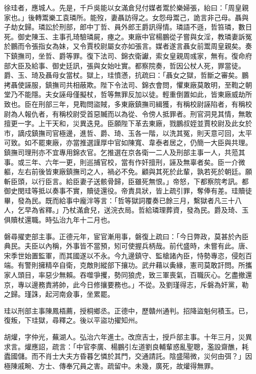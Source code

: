 \begin{pinyinscope}
徐珪者，應城人。先是，千戶吳能以女滿倉兒付媒者鬻於樂婦張，紿曰：「周皇親家也。」後轉鬻樂工袁璘所。能歿，妻聶訪得之。女怨母鬻己，詭言非己母。聶與子劫女歸。璘訟於刑部，郎中丁哲、員外郎王爵訊得情。璘語不遜，哲笞璘，數日死。御史陳玉、主事孔琦驗璘屍，瘞之。東廠中官楊鵬從子嘗與女淫，教璘妻訴冤於鵬而令張指女為妹，又令賈校尉屬女亦如張言。媒者遂言聶女前鬻周皇親矣。奏下鎮撫司，坐哲、爵等罪。復下法司、錦衣衛讞，索女皇親周彧家，無有。復命府部大臣及給事、御史廷訊，張與女始吐實。都察院奏，哲因公杖人死，罪當徒。爵、玉、琦及聶母女當杖。獄上，珪憤懣，抗疏曰：「聶女之獄，哲斷之審矣。鵬拷聶使誣服，鎮撫司共相蔽欺。陛下令法司、錦衣會問，懼東廠莫敢明，至鞫之朝堂乃不能隱。夫女誣母僅擬杖，哲等無罪反加以徒。輕重倒置如此，皆東廠威劫所致也。臣在刑部三年，見鞫問盜賊，多東廠鎮撫司緝獲，有稱校尉誣陷者，有稱校尉為人報仇者，有稱校尉受首惡贓而以為從、令傍人抵罪者。刑官洞見其情，無敢擅更一字。上干天和，災異迭見。臣願陛下革去東廠，戮鵬叔姪並賈校尉及此女於市，謫戍鎮撫司官極邊，進哲、爵、琦、玉各一階，以洗其冤，則天意可回，太平可致。如不罷東廠，亦當推選謹厚中官如陳寬、韋泰者居之，仍簡一大臣與共理。鎮撫司理刑亦不宜專用錦衣官。乞推選在京各衛一二人及刑部主事一人，共蒞其事。或三年、六年一更，則巡捕官校，當有作奸擅刑，誣及無辜者矣。臣一介微軀，左右前後皆東廠鎮撫司之人，禍必不免。顧與其死於此輩，孰若死於朝廷。願斬臣頭，以行臣言。給臣妻子送骸骨歸，臣雖死無恨。」帝怒，下都察院考訊。都御史閔珪等抵以奏事不實，贖徒還役。帝責具狀，皆上疏引罪，奪俸有差。珪贖徒畢，發為民。既而給事中龐泮等言：「哲等獄詞覆奏已餘三月，繫獄者凡三十八人，乞早為省釋。」乃杖滿倉兒，送浣衣局。哲給璘理葬資，發為民。爵及琦、玉俱贖杖還職。時弘治九年十二月也。

磐尋擢吏部主事。正德元年，宦官漸用事，磐復上疏曰：「今日弊政，莫甚於內臣典民。夫臣以內稱，外事皆不當預，矧可使握兵柄哉。前代盛時，未嘗有此。唐、宋季世始置監軍，而其國遂以不永。今九邊鎮守、監槍諸內臣，恃勢專恣，侵剋百端。有警則擁精卒自衛，克敵則縱部下攘功。武弁藉以夤緣，憲司莫敢訐問。所攜家人頭目，率惡少無賴。吞噬爭攫，勢同狼虎，致三軍喪氣，百職灰心。乞盡撤還京，專以邊務責將帥，此今日修攘要務也。」不從。及劉瑾得志，斥磐為奸黨，勒之歸。瑾誅，起河南僉事，坐累罷。

珪以刑部主事陳鳳梧薦，授桐鄉丞。正德中，歷贛州通判。招降盜魁何積玉。已，復叛，下珪獄，尋釋之。後以平盜功擢知州。

胡爟，字仲光，蕪湖人。弘治六年進士。改庶吉士，授戶部主事。十年三月，災異求言。爟應詔，疏言：「中官李廣、楊鵬引左道劉良輔輩惑亂聖聰，濫設齋醮，耗蠹國儲。而不肖士大夫方昏暮乞憐於其門，交通請託。陰盛陽微，災何由弭？」因極陳戚畹、方士、傳奉冗員之害。疏留中。未幾，廣死，故爟得無罪。


\end{pinyinscope}
